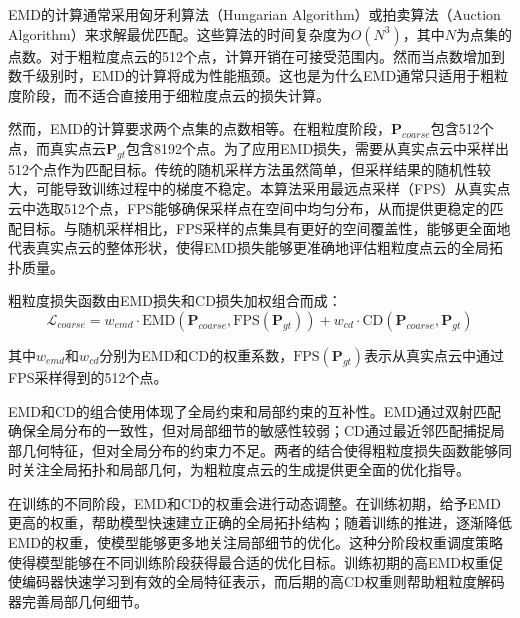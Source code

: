 


EMD的计算通常采用匈牙利算法（Hungarian Algorithm）或拍卖算法（Auction Algorithm）来求解最优匹配。这些算法的时间复杂度为$O(N^3)$，其中$N$为点集的点数。对于粗粒度点云的512个点，计算开销在可接受范围内。然而当点数增加到数千级别时，EMD的计算将成为性能瓶颈。这也是为什么EMD通常只适用于粗粒度阶段，而不适合直接用于细粒度点云的损失计算。

然而，EMD的计算要求两个点集的点数相等。在粗粒度阶段，$\mathbf{P}_{coarse}$包含512个点，而真实点云$\mathbf{P}_{gt}$包含8192个点。为了应用EMD损失，需要从真实点云中采样出512个点作为匹配目标。传统的随机采样方法虽然简单，但采样结果的随机性较大，可能导致训练过程中的梯度不稳定。本算法采用最远点采样（FPS）从真实点云中选取512个点，FPS能够确保采样点在空间中均匀分布，从而提供更稳定的匹配目标。与随机采样相比，FPS采样的点集具有更好的空间覆盖性，能够更全面地代表真实点云的整体形状，使得EMD损失能够更准确地评估粗粒度点云的全局拓扑质量。

粗粒度损失函数由EMD损失和CD损失加权组合而成：
\begin{equation}
\mathcal{L}_{coarse} = w_{emd} \cdot \text{EMD}(\mathbf{P}_{coarse}, \text{FPS}(\mathbf{P}_{gt})) + w_{cd} \cdot \text{CD}(\mathbf{P}_{coarse}, \mathbf{P}_{gt})
\end{equation}

其中$w_{emd}$和$w_{cd}$分别为EMD和CD的权重系数，$\text{FPS}(\mathbf{P}_{gt})$表示从真实点云中通过FPS采样得到的512个点。

EMD和CD的组合使用体现了全局约束和局部约束的互补性。EMD通过双射匹配确保全局分布的一致性，但对局部细节的敏感性较弱；CD通过最近邻匹配捕捉局部几何特征，但对全局分布的约束力不足。两者的结合使得粗粒度损失函数能够同时关注全局拓扑和局部几何，为粗粒度点云的生成提供更全面的优化指导。

在训练的不同阶段，EMD和CD的权重会进行动态调整。在训练初期，给予EMD更高的权重，帮助模型快速建立正确的全局拓扑结构；随着训练的推进，逐渐降低EMD的权重，使模型能够更多地关注局部细节的优化。这种分阶段权重调度策略使得模型能够在不同训练阶段获得最合适的优化目标。训练初期的高EMD权重促使编码器快速学习到有效的全局特征表示，而后期的高CD权重则帮助粗粒度解码器完善局部几何细节。


